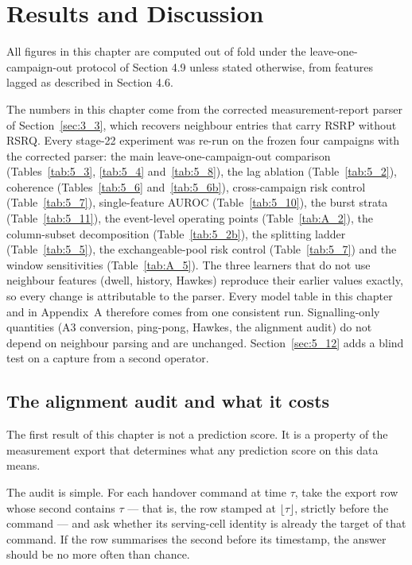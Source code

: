 \chapter{Results and Discussion}\label{ch:5}

All figures in this chapter are computed out of fold under the leave-one-campaign-out protocol of Section 4.9 unless stated otherwise, from features lagged as described in Section 4.6.

The numbers in this chapter come from the corrected measurement-report parser of Section~\ref{sec:3_3}, which recovers neighbour entries that carry RSRP without RSRQ. Every stage-22 experiment was re-run on the frozen four campaigns with the corrected parser: the main leave-one-campaign-out comparison (Tables~\ref{tab:5_3}, \ref{tab:5_4} and~\ref{tab:5_8}), the lag ablation (Table~\ref{tab:5_2}), coherence (Tables~\ref{tab:5_6} and~\ref{tab:5_6b}), cross-campaign risk control (Table~\ref{tab:5_7}), single-feature AUROC (Table~\ref{tab:5_10}), the burst strata (Table~\ref{tab:5_11}), the event-level operating points (Table~\ref{tab:A_2}), the column-subset decomposition (Table~\ref{tab:5_2b}), the splitting ladder (Table~\ref{tab:5_5}), the exchangeable-pool risk control (Table~\ref{tab:5_7}) and the window sensitivities (Table~\ref{tab:A_5}). The three learners that do not use neighbour features (dwell, history, Hawkes) reproduce their earlier values exactly, so every change is attributable to the parser. Every model table in this chapter and in Appendix~A therefore comes from one consistent run. Signalling-only quantities (A3 conversion, ping-pong, Hawkes, the alignment audit) do not depend on neighbour parsing and are unchanged. Section~\ref{sec:5_12} adds a blind test on a capture from a second operator.


\section{The alignment audit and what it costs}
\label{sec:5_1}

The first result of this chapter is not a prediction score. It is a property of the measurement export that determines what any prediction score on this data means.

The audit is simple. For each handover command at time $\tau$, take the export row whose second contains $\tau$ --- that is, the row stamped at $\lfloor\tau\rfloor$, strictly before the command --- and ask whether its serving-cell identity is already the target of that command. If the row summarises the second before its timestamp, the answer should be no more often than chance.


